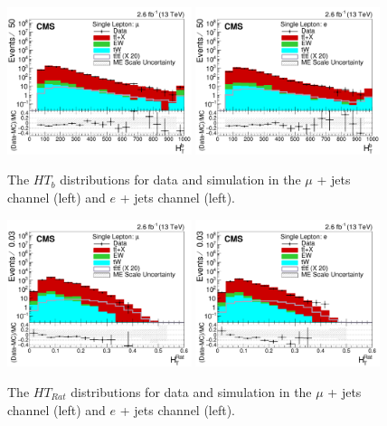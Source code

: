 \begin{figure}[ht!]
    \includegraphics[width=0.48\textwidth]{images/Run2/HTb_StackLogY.pdf}
    \includegraphics[width=0.48\textwidth]{images/Run2/HTb_StackLogY_e.pdf}
    \caption{The $HT_{b}$ distributions for data and simulation in the $\mu$ + jets channel (left) and $e$ + jets channel (left).}
    \label{fig:HTB}
\end{figure}


\begin{figure}[ht!]
    \includegraphics[width=0.48\textwidth]{images/Run2/HTRat_StackLogY.pdf}
    \includegraphics[width=0.48\textwidth]{images/Run2/HTRat_StackLogY_e.pdf}
    \caption{The $HT_{Rat}$ distributions for data and simulation in the $\mu$ + jets channel (left) and $e$ + jets channel (left).}
    \label{fig:HTRat}
\end{figure}



